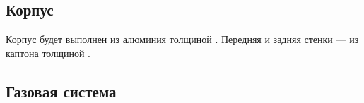 
%                             

\subsection{Корпус}

Корпус будет выполнен из алюминия толщиной \todo. Передняя и задняя стенки --- из каптона \todo толщиной \todo.


\subsection{Газовая система}


